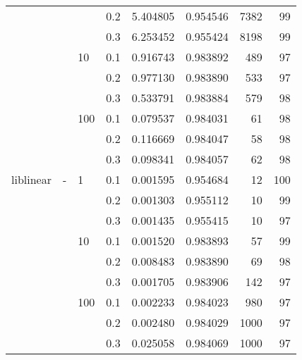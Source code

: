 \begin{table}[H]
\begin{tabular}{llllrrrr}
          &   &     & 0.2 &   5.404805 &  0.954546 &    7382 &    99 \\
          &   &     & 0.3 &   6.253452 &  0.955424 &    8198 &    99 \\
          &   & 10  & 0.1 &   0.916743 &  0.983892 &     489 &    97 \\
          &   &     & 0.2 &   0.977130 &  0.983890 &     533 &    97 \\
          &   &     & 0.3 &   0.533791 &  0.983884 &     579 &    98 \\
          &   & 100 & 0.1 &   0.079537 &  0.984031 &      61 &    98 \\
          &   &     & 0.2 &   0.116669 &  0.984047 &      58 &    98 \\
          &   &     & 0.3 &   0.098341 &  0.984057 &      62 &    98 \\
liblinear & - & 1   & 0.1 &   0.001595 &  0.954684 &      12 &   100 \\
          &   &     & 0.2 &   0.001303 &  0.955112 &      10 &    99 \\
          &   &     & 0.3 &   0.001435 &  0.955415 &      10 &    97 \\
          &   & 10  & 0.1 &   0.001520 &  0.983893 &      57 &    99 \\
          &   &     & 0.2 &   0.008483 &  0.983890 &      69 &    98 \\
          &   &     & 0.3 &   0.001705 &  0.983906 &     142 &    97 \\
          &   & 100 & 0.1 &   0.002233 &  0.984023 &     980 &    97 \\
          &   &     & 0.2 &   0.002480 &  0.984029 &    1000 &    97 \\
          &   &     & 0.3 &   0.025058 &  0.984069 &    1000 &    97 \\
\bottomrule
\end{tabular}
\end{table}
